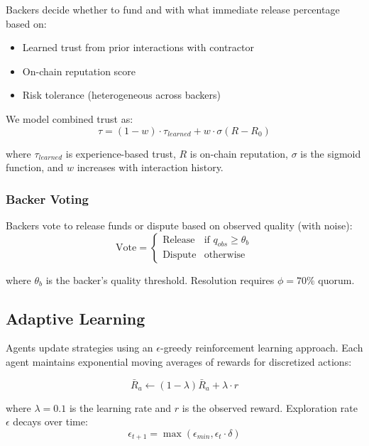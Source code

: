 \documentclass[11pt,a4paper]{article}
\begin{document}
Backers decide whether to fund and with what immediate release percentage based on:
\begin{itemize}
    \item Learned trust from prior interactions with contractor
    \item On-chain reputation score
    \item Risk tolerance (heterogeneous across backers)
\end{itemize}

We model combined trust as:
\begin{equation}
    \tau = (1-w) \cdot \tau_{learned} + w \cdot \sigma(R - R_0)
\end{equation}

where $\tau_{learned}$ is experience-based trust, $R$ is on-chain reputation, $\sigma$ is the sigmoid function, and $w$ increases with interaction history.

\subsubsection{Backer Voting}

Backers vote to release funds or dispute based on observed quality (with noise):
\begin{equation}
    \text{Vote} = \begin{cases}
        \text{Release} & \text{if } q_{obs} \geq \theta_b \\
        \text{Dispute} & \text{otherwise}
    \end{cases}
\end{equation}

where $\theta_b$ is the backer's quality threshold. Resolution requires $\phi = 70\%$ quorum.

\subsection{Adaptive Learning}

Agents update strategies using an $\epsilon$-greedy reinforcement learning approach. Each agent maintains exponential moving averages of rewards for discretized actions:

\begin{equation}
    \bar{R}_a \leftarrow (1-\lambda) \bar{R}_a + \lambda \cdot r
\end{equation}

where $\lambda = 0.1$ is the learning rate and $r$ is the observed reward. Exploration rate $\epsilon$ decays over time:
\begin{equation}
    \epsilon_{t+1} = \max(\epsilon_{min}, \epsilon_t \cdot \delta)
\end{equation}
\end{document}

